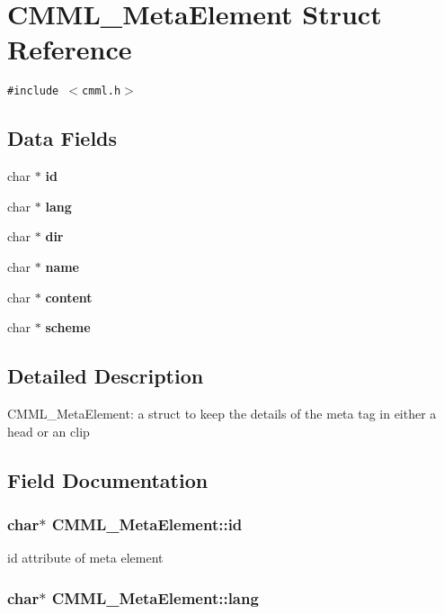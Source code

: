 \section{CMML\_\-Meta\-Element Struct Reference}
\label{structCMML__MetaElement}
{\tt \#include $<$cmml.h$>$}

\subsection*{Data Fields}
\begin{CompactItemize}
\item 
char $\ast$ {\bf id}
\item 
char $\ast$ {\bf lang}
\item 
char $\ast$ {\bf dir}
\item 
char $\ast$ {\bf name}
\item 
char $\ast$ {\bf content}
\item 
char $\ast$ {\bf scheme}
\end{CompactItemize}


\subsection{Detailed Description}
CMML\_\-Meta\-Element: a struct to keep the details of the meta tag in either a head or an clip 



\subsection{Field Documentation}
\subsubsection{\setlength{\rightskip}{0pt plus 5cm}char$\ast$ {\bf CMML\_\-Meta\-Element::id}}\label{structCMML__MetaElement_o0}


id attribute of meta element 
\subsubsection{\setlength{\rightskip}{0pt plus 5cm}char$\ast$ {\bf CMML\_\-Meta\-Element::lang}}\label{structCMML__MetaElement_o1}


